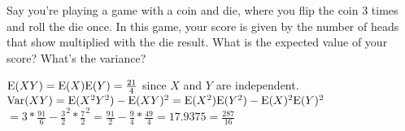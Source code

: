 \question Say you're playing a game with a coin and die, where you 
flip the coin 3 times and roll the die once. In this game, your score 
is given by the number of heads that show multiplied with the die result. 
What is the expected value of your score? What's the variance?
\begin{solution}[3cm]
$\text{E}(XY) = \text{E}(X)\text{E}(Y) =\frac{21}{4}$ since $X$ and $Y$ are independent.
$\text{Var}(XY) = \text{E}(X^2Y^2) - \text{E}(XY)^2 = \text{E}(X^2)\text{E}(Y^2) - \text{E}(X)^2 \text{E}(Y)^2$
               $= 3*\frac{91}{6} - \frac{3}{2}^2 * \frac{7}{2}^2 = 
               \frac{91}{2} - \frac{9}{4} * \frac{49}{4} = 17.9375 = \frac{287}{16}$
\end{solution}